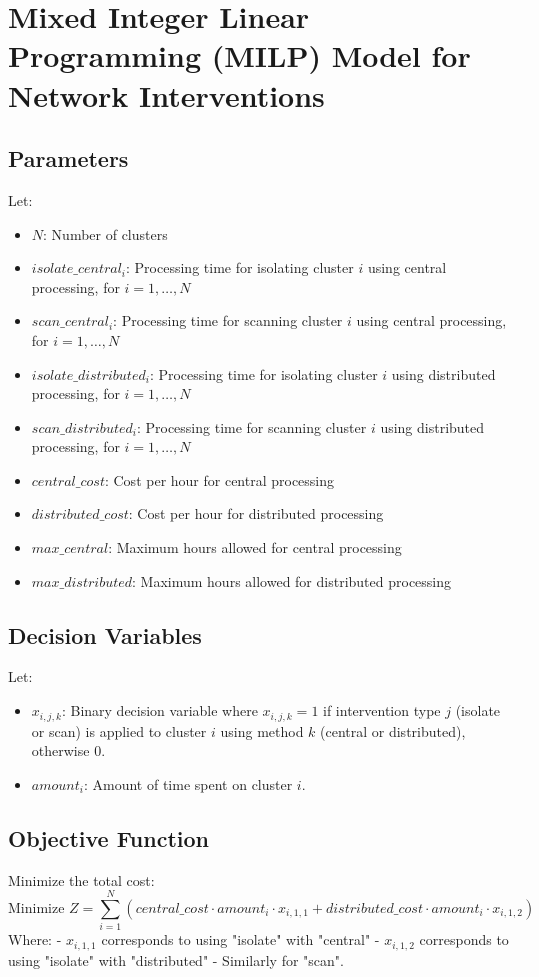 \documentclass{article}
\begin{document}
\section*{Mixed Integer Linear Programming (MILP) Model for Network Interventions}

\subsection*{Parameters}
Let:
\begin{itemize}
    \item $N$: Number of clusters
    \item $isolate\_central_i$: Processing time for isolating cluster $i$ using central processing, for $i = 1, \ldots, N$
    \item $scan\_central_i$: Processing time for scanning cluster $i$ using central processing, for $i = 1, \ldots, N$
    \item $isolate\_distributed_i$: Processing time for isolating cluster $i$ using distributed processing, for $i = 1, \ldots, N$
    \item $scan\_distributed_i$: Processing time for scanning cluster $i$ using distributed processing, for $i = 1, \ldots, N$
    \item $central\_cost$: Cost per hour for central processing
    \item $distributed\_cost$: Cost per hour for distributed processing
    \item $max\_central$: Maximum hours allowed for central processing
    \item $max\_distributed$: Maximum hours allowed for distributed processing
\end{itemize}

\subsection*{Decision Variables}
Let:
\begin{itemize}
    \item $x_{i,j,k}$: Binary decision variable where $x_{i,j,k} = 1$ if intervention type $j$ (isolate or scan) is applied to cluster $i$ using method $k$ (central or distributed), otherwise $0$.
    \item $amount_i$: Amount of time spent on cluster $i$.
\end{itemize}

\subsection*{Objective Function}
Minimize the total cost:
\[
\text{Minimize } Z = \sum_{i=1}^N \left( central\_cost \cdot amount_i \cdot x_{i,1,1} + distributed\_cost \cdot amount_i \cdot x_{i,1,2} \right)
\]
Where:
- $x_{i,1,1}$ corresponds to using "isolate" with "central"
- $x_{i,1,2}$ corresponds to using "isolate" with "distributed"
- Similarly for "scan".
\end{document}
